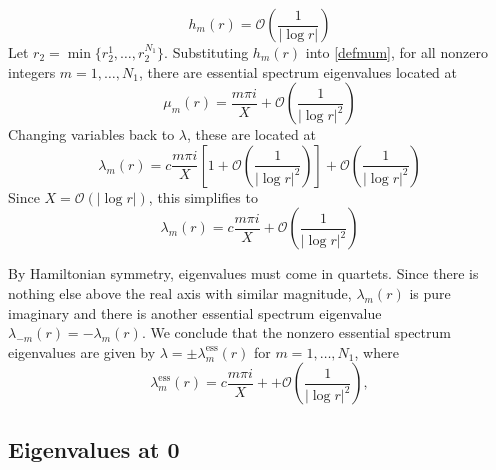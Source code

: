 \documentclass[thesis.tex]{subfiles}
\begin{document}
\[
h_m(r) = \mathcal{O}\left( \frac{1}{|\log r|} \right)
\]
Let $r_2 = \min\{ r_2^1, \dots, r_2^{N_1} \}$. Substituting $h_m(r)$ into \cref{defmum}, for all nonzero integers $m = 1, \dots, N_1$, there are essential spectrum eigenvalues located at
\[
\mu_m(r) = \frac{m \pi i}{X} + \mathcal{O}\left( \frac{1}{|\log r|^2} \right)
\]
Changing variables back to $\lambda$, these are located at
\[
\lambda_m(r) = c \frac{m \pi i}{X}\left[1 + \mathcal{O}\left( \frac{1}{|\log r|^2} \right) \right] +\mathcal{O}\left( \frac{1}{|\log r|^2} \right)
\]
Since $X = \mathcal{O}(|\log r|)$, this simplifies to
\[
\lambda_m(r) = c \frac{m \pi i}{X} +\mathcal{O}\left( \frac{1}{|\log r|^2} \right)
\]

By Hamiltonian symmetry, eigenvalues must come in quartets. Since there is nothing else above the real axis with similar magnitude, $\lambda_m(r)$ is pure imaginary and there is another essential spectrum eigenvalue $\lambda_{-m}(r) = -\lambda_m(r)$. We conclude that the nonzero essential spectrum eigenvalues are given by $\lambda = \pm \lambda_m^{\text{ess}}(r)$ for $m = 1, \dots, N_1$, where
\[
\lambda_m^{\text{ess}}(r) = c \frac{m \pi i}{X} + +\mathcal{O}\left( \frac{1}{|\log r|^2} \right),
\]

\subsection{Eigenvalues at 0}\label{sec:eigcount0}
\end{document}
